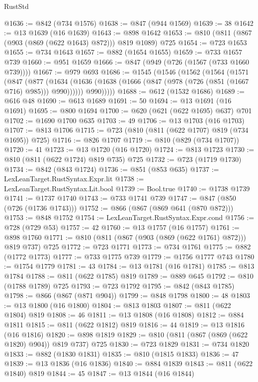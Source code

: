 \begin{lexlean}{RustStd}
\begin{coremodule}
@1636 := @842 (@734 @1576)
@1638 := @847 (@944 @1569)
@1639 := 38
@1642 := @13 @1639 (@16 @1639)
@1643 := @898 @1642
@1653 := @810 (@811 (@867 (@903 (@869 (@622 @1643) @872))) @819 @1089) @725
@1654 := @723 @1653
@1655 := @734 @1643
@1657 := @882 (@1654 @1655)
@1659 := @733 @1657 @739
@1660 := @951 @1659
@1666 := @847 (@949 (@726 (@1567 (@733 @1660 @739))))
@1667 := @979 @693
@1686 := @1545
    (@1546
      (@1562
        (@1564
          (@1571
            (@847
              (@877
                (@1634 (@1636 (@1638 (@1666 (@847 (@978 (@726 (@851 (@1667 @716) @985))) @990))))))
              @990)))))
@1688 := @612 (@1532 @1686)
@1689 := @616 @48
@1690 := @613 @1689
@1691 := 50
@1694 := @13 @1691 (@16 @1691)
@1695 := @800 @1694
@1700 := @620 (@621 (@622 @1695) @637) @701
@1702 := @1690 @1700 @635
@1703 := 49
@1706 := @13 @1703 (@16 @1703)
@1707 := @813 @1706
@1715 := @723 (@810 (@811 (@622 @1707) @819 (@734 @1695)) @725)
@1716 := @826 @1707
@1719 := @810 (@829 (@734 @1707))
@1720 := 41
@1723 := @13 @1720 (@16 @1720)
@1724 := @813 @1723
@1730 := @810 (@811 (@622 @1724) @819 @735) @725
@1732 := @723 (@1719 @1730)
@1734 := @842 (@843 @1724)
@1736 := @851 (@853 @635)
@1737 := LexLeanTarget.RustSyntax.Expr.lit
@1738 := LexLeanTarget.RustSyntax.Lit.bool
@1739 := Bool.true
@1740 := @1738 @1739
@1741 := @1737 @1740
@1743 := @733 @1741 @739
@1747 := @847 (@850 (@726 (@1736 @1743)))
@1752 := @866 (@867 (@869 @641 (@870 @872)))
@1753 := @848 @1752
@1754 := LexLeanTarget.RustSyntax.Expr.cond
@1756 := @728 (@729 @53)
@1757 := 42
@1760 := @13 @1757 (@16 @1757)
@1761 := @898 @1760
@1771 := @810 (@811 (@867 (@903 (@869 (@622 @1761) @872))) @819 @737) @725
@1772 := @723 @1771
@1773 := @734 @1761
@1775 := @882 (@1772 @1773)
@1777 := @733 @1775 @739
@1779 := @1756 @1777 @743
@1780 := @1754 @1779
@1781 := 43
@1784 := @13 @1781 (@16 @1781)
@1785 := @813 @1784
@1788 := @811 (@622 @1785) @819
@1789 := @889 @645
@1792 := @810 (@1788 @1789) @725
@1793 := @723 @1792
@1795 := @842 (@843 @1785)
@1798 := @866 (@867 (@871 @904))
@1799 := @848 @1798
@1800 := 48
@1803 := @13 @1800 (@16 @1800)
@1804 := @813 @1803
@1807 := @811 (@622 @1804) @819
@1808 := 46
@1811 := @13 @1808 (@16 @1808)
@1812 := @884 @1811
@1815 := @811 (@622 @1812) @819
@1816 := 44
@1819 := @13 @1816 (@16 @1816)
@1820 := @898 @1819
@1829 := @810 (@811 (@867 (@869 (@622 @1820) @904)) @819 @737) @725
@1830 := @723 @1829
@1831 := @734 @1820
@1833 := @882 (@1830 @1831)
@1835 := @810 (@1815 @1833)
@1836 := 47
@1839 := @13 @1836 (@16 @1836)
@1840 := @884 @1839
@1843 := @811 (@622 @1840) @819
@1844 := 45
@1847 := @13 @1844 (@16 @1844)

\end{coremodule}
\end{lexlean}

